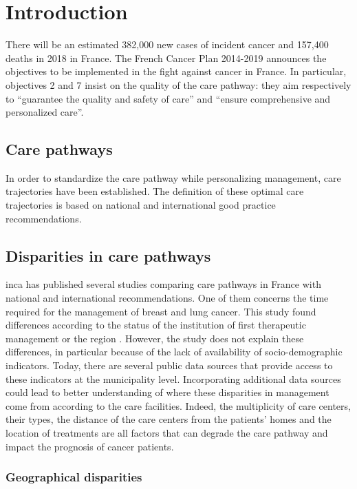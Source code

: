 \chapter{Introduction}

There will be an estimated 382,000 new cases of incident cancer and 157,400 deaths in 2018 in France. The French Cancer Plan \cite{buzyn_plan_2014} 2014-2019 announces the objectives to be implemented in the fight against cancer in France. In particular, objectives 2 and 7 insist on the quality of the care pathway: they aim respectively to ``guarantee the quality and safety of care'' and ``ensure comprehensive and personalized care''.

\section{Care pathways}

In order to standardize the care pathway while personalizing management, care trajectories have been established. The definition of these optimal care trajectories is based on national and international good practice recommendations.

\section{Disparities in care pathways}

\ac{inca} has published several studies comparing care pathways in France with national and international recommendations. One of them concerns the time required for the management of breast and lung cancer. This study found differences according to the status of the institution of first therapeutic management or the region \cite{bernard_ledesert_etude_2012}. However, the study does not explain these differences, in particular because of the lack of availability of socio-demographic indicators. Today, there are several public data sources that provide access to these indicators at the municipality level. Incorporating additional data sources could lead to better understanding of where these disparities in management come from according to the care facilities. Indeed, the multiplicity of care centers, their types, the distance of the care centers from the patients' homes and the location of treatments are all factors that can degrade the care pathway and impact the prognosis of cancer patients.

\subsection*{Geographical disparities}

